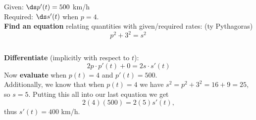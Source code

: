 \begin{frame}
\begin{example}
\begin{columns}[c]
 
 Given:      $\ds p'(t)= 500$ km/h  \\
 Required: $ \ds s'(t) $ when $ p=4.$ \pause \\
\textbf{Find an equation}  relating quantities with given/required rates:  \pause (ty Pythagoras)
\[
p^2+3^2=s^2
\]   \pause 
\end{columns}


\textbf{Differentiate} (implicitly with respect to $ t $):
\[
2p\cdot p'(t)+ 0 =2s\cdot s'(t)
\]
\pause 
Now \textbf{evaluate} when  $p(t)=4$ and $p'(t) =
500$.\\ \pause 
Additionally, we know that when $ p(t)=4 $ we have  $s^2=p^2+3^2=16+9=25$, so
$s=5$.  \pause 
Putting this all into our last equation we get
\[
2(4)(500)=2(5)s'(t),
\]
thus $s'(t)=400$ km/h.
\end{example}
\end{frame}



